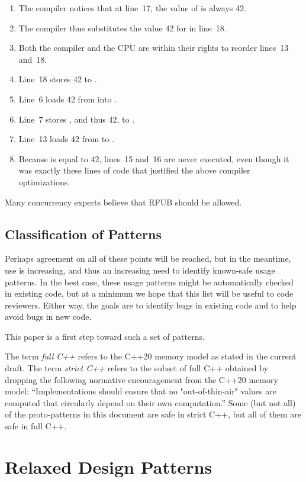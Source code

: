 \documentclass[10]{article}
\begin{document}
\begin{enumerate}
\item	The compiler notices that at line~17, the value of 
	is always 42.
\item	The compiler thus substitutes the value 42 for  in
	line~18.
\item	Both the compiler and the CPU are within their rights to reorder
	lines~13 and~18.
\item	Line~18 stores 42 to .
\item	Line~6 loads 42 from  into .
\item	Line~7 stores , and thus 42, to .
\item	Line~13 loads 42 from  to .
\item	Because  is equal to 42, lines~15 and~16 are never
	executed, even though it was exactly these lines of code
	that justified the above compiler optimizations.
\end{enumerate}

Many concurrency experts believe that RFUB should be allowed.

\subsection{Classification of Patterns}
\label{sec:Classification of Patterns}

Perhaps agreement on all of these points will be reached, but in the
meantime,  use is increasing, and thus an
increasing need to identify known-safe usage patterns.
In the best case, these usage patterns might be automatically checked
in existing code, but at a minimum we hope that this list will be
useful to code reviewers.
Either way, the goals are to identify bugs in existing code and to
help avoid bugs in new code.

This paper is a first step toward such a set of patterns.

The term \emph{full C++} refers to the C++20 memory model as stated in
the current draft.
The term \emph{strict C++} refers to the subset of full C++ obtained
by dropping the following normative encouragement from the C++20 memory
model:
``Implementations should ensure that no "out-of-thin-air" values are
computed that circularly depend on their own computation.''
Some (but not all) of the proto-patterns in this document are safe in
strict C++, but all of them are safe in full C++.

\section{Relaxed Design Patterns}
\label{sec:Relaxed Design Patterns}
\end{document}
